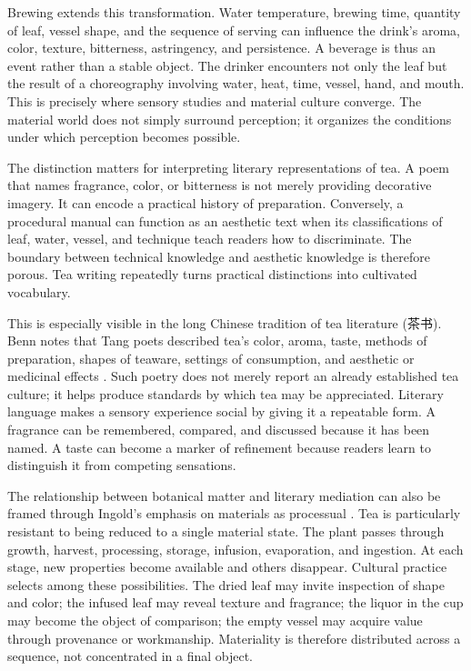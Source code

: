 \documentclass[numbers]{IntechOpen-Book}
\newcommand{\zh}[1]{{\CJKfontspec{Noto Serif CJK SC}\upshape #1}}
\begin{document}
Brewing extends this transformation. Water temperature, brewing time, quantity of leaf, vessel shape, and the sequence of serving can influence the drink's aroma, color, texture, bitterness, astringency, and persistence. A beverage is thus an event rather than a stable object. The drinker encounters not only the leaf but the result of a choreography involving water, heat, time, vessel, hand, and mouth. This is precisely where sensory studies and material culture converge. The material world does not simply surround perception; it organizes the conditions under which perception becomes possible.

The distinction matters for interpreting literary representations of tea. A poem that names fragrance, color, or bitterness is not merely providing decorative imagery. It can encode a practical history of preparation. Conversely, a procedural manual can function as an aesthetic text when its classifications of leaf, water, vessel, and technique teach readers how to discriminate. The boundary between technical knowledge and aesthetic knowledge is therefore porous. Tea writing repeatedly turns practical distinctions into cultivated vocabulary.

This is especially visible in the long Chinese tradition of tea literature (\zh{茶书}). Benn notes that Tang poets described tea's color, aroma, taste, methods of preparation, shapes of teaware, settings of consumption, and aesthetic or medicinal effects \cite{bennpoetry}. Such poetry does not merely report an already established tea culture; it helps produce standards by which tea may be appreciated. Literary language makes a sensory experience social by giving it a repeatable form. A fragrance can be remembered, compared, and discussed because it has been named. A taste can become a marker of refinement because readers learn to distinguish it from competing sensations.

The relationship between botanical matter and literary mediation can also be framed through Ingold's emphasis on materials as processual \cite{ingoldmaterials}. Tea is particularly resistant to being reduced to a single material state. The plant passes through growth, harvest, processing, storage, infusion, evaporation, and ingestion. At each stage, new properties become available and others disappear. Cultural practice selects among these possibilities. The dried leaf may invite inspection of shape and color; the infused leaf may reveal texture and fragrance; the liquor in the cup may become the object of comparison; the empty vessel may acquire value through provenance or workmanship. Materiality is therefore distributed across a sequence, not concentrated in a final object.
\end{document}
